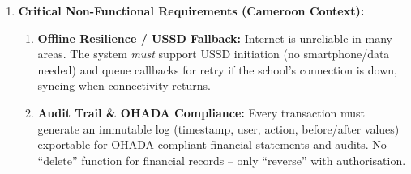 \documentclass[11pt]{article}
\begin{document}
\begin{exoresolu}
\begin{enumerate}
\begin{enumerate}
    \end{enumerate}
    \textbf{TO-BE BPMN Fragment (Parent Pays via MoMo):}
    \begin{itemize}
        \item \textbf{Lanes:} Parent, MoMo System (External), School Management System, Bursar (Monitor), Class Teacher (Monitor).
        \item \textbf{Start Event (Message):} Parent initiates USSD/App payment.
        \item \textbf{Service Task (MoMo System):} Validate PIN, Check Float, Debit Parent, Credit School account.
        \item \textbf{Message Flow:} MoMo $\to$ SMS: Transaction Callback (StudentID, Amount, Ref, Timestamp).
        \item \textbf{Service Task (SMS):} Verify StudentID, Update Balance, Generate Digital Receipt, Trigger Notifications.
        \item \textbf{Parallel Gateway (AND):} Split to three Send Tasks: Send SMS to Parent (Receipt Ref); Update Bursar Dashboard (real time); Update Teacher Portal (Paid flag).
        \item \textbf{End Event:} Payment Confirmed.
    \end{itemize}
    \item \textbf{Critical Non-Functional Requirements (Cameroon Context):}
    \begin{enumerate}
        \item \textbf{Offline Resilience / USSD Fallback:} Internet is unreliable in many areas. The system \emph{must} support USSD initiation (no smartphone/data needed) and queue callbacks for retry if the school's connection is down, syncing when connectivity returns.
        \item \textbf{Audit Trail \& OHADA Compliance:} Every transaction must generate an immutable log (timestamp, user, action, before/after values) exportable for OHADA-compliant financial statements and audits. No ``delete'' function for financial records -- only ``reverse'' with authorisation.
    \end{enumerate}
\end{enumerate}
\end{exoresolu}
\end{document}
